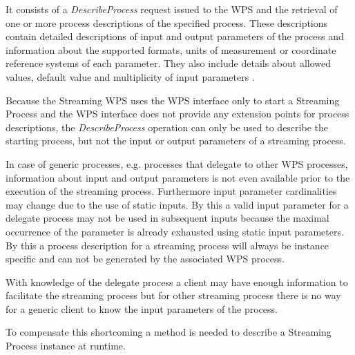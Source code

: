 		It consists of a \emph{DescribeProcess} request issued to the \ac{WPS} and the retrieval of one or more process descriptions of the specified process. These descriptions contain detailed descriptions of input and output parameters of the process and information about the supported formats, units of measurement or coordinate reference systems of each parameter. They also include details about allowed values, default value and multiplicity of input parameters \citep{ogc:wps}.

		Because the Streaming \ac{WPS} uses the \ac{WPS} interface only to start a Streaming Process and the \ac{WPS} interface does not provide any extension points for process descriptions, the \emph{DescribeProcess} operation can only be used to describe the starting process, but not the input or output parameters of a streaming process.

		In case of generic processes, e.g. processes that delegate to other \ac{WPS} processes, information about input and output parameters is not even available prior to the execution of the streaming process. Furthermore input parameter cardinalities may change due to the use of static inputs. By this a valid input parameter for a delegate process may not be used in subsequent inputs because the maximal occurrence of the parameter is already exhausted using static input parameters. By this a process description for a streaming process will always be instance specific and can not be generated by the associated \ac{WPS} process.

		With knowledge of the delegate process a client may have enough information to facilitate the streaming process but for other streaming process there is no way for a generic client to know the input parameters of the process.

		To compensate this shortcoming a method is needed to describe a Streaming Process instance at runtime.

